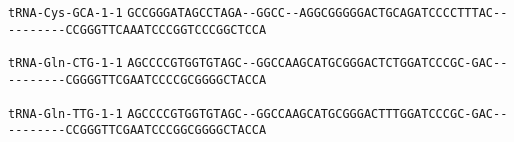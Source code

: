 \documentclass{article}
\newcommand{\rnabox}[1]{\colorbox{#1}{\texttt{#1}}}
\begin{document}
\vspace{-0.5mm}

\texttt{tRNA-Cys-GCA-1-1}
\rnabox{G}\rnabox{C}\rnabox{C}\rnabox{G}\rnabox{G}\rnabox{G}\rnabox{A}\rnabox{T}\rnabox{A}\rnabox{G}\rnabox{C}\rnabox{C}\rnabox{T}\rnabox{A}\rnabox{G}\rnabox{A}\rnabox{-}\rnabox{-}\rnabox{G}\rnabox{G}\rnabox{C}\rnabox{C}\rnabox{-}\rnabox{-}\rnabox{A}\rnabox{G}\rnabox{G}\rnabox{C}\rnabox{G}\rnabox{G}\rnabox{G}\rnabox{G}\rnabox{G}\rnabox{A}\rnabox{C}\rnabox{T}\rnabox{G}\rnabox{C}\rnabox{A}\rnabox{G}\rnabox{A}\rnabox{T}\rnabox{C}\rnabox{C}\rnabox{C}\rnabox{C}\rnabox{T}\rnabox{T}\rnabox{T}\rnabox{A}\rnabox{C}\rnabox{-}\rnabox{-}\rnabox{-}\rnabox{-}\rnabox{-}\rnabox{-}\rnabox{-}\rnabox{-}\rnabox{-}\rnabox{-}\rnabox{C}\rnabox{C}\rnabox{G}\rnabox{G}\rnabox{G}\rnabox{T}\rnabox{T}\rnabox{C}\rnabox{A}\rnabox{A}\rnabox{A}\rnabox{T}\rnabox{C}\rnabox{C}\rnabox{C}\rnabox{G}\rnabox{G}\rnabox{T}\rnabox{C}\rnabox{C}\rnabox{C}\rnabox{G}\rnabox{G}\rnabox{C}\rnabox{T}\rnabox{C}\rnabox{C}\rnabox{A}

\vspace{-0.5mm}

\texttt{tRNA-Gln-CTG-1-1}
\rnabox{A}\rnabox{G}\rnabox{C}\rnabox{C}\rnabox{C}\rnabox{C}\rnabox{G}\rnabox{T}\rnabox{G}\rnabox{G}\rnabox{T}\rnabox{G}\rnabox{T}\rnabox{A}\rnabox{G}\rnabox{C}\rnabox{-}\rnabox{-}\rnabox{G}\rnabox{G}\rnabox{C}\rnabox{C}\rnabox{A}\rnabox{A}\rnabox{G}\rnabox{C}\rnabox{A}\rnabox{T}\rnabox{G}\rnabox{C}\rnabox{G}\rnabox{G}\rnabox{G}\rnabox{A}\rnabox{C}\rnabox{T}\rnabox{C}\rnabox{T}\rnabox{G}\rnabox{G}\rnabox{A}\rnabox{T}\rnabox{C}\rnabox{C}\rnabox{C}\rnabox{G}\rnabox{C}\rnabox{-}\rnabox{G}\rnabox{A}\rnabox{C}\rnabox{-}\rnabox{-}\rnabox{-}\rnabox{-}\rnabox{-}\rnabox{-}\rnabox{-}\rnabox{-}\rnabox{-}\rnabox{-}\rnabox{C}\rnabox{G}\rnabox{G}\rnabox{G}\rnabox{G}\rnabox{T}\rnabox{T}\rnabox{C}\rnabox{G}\rnabox{A}\rnabox{A}\rnabox{T}\rnabox{C}\rnabox{C}\rnabox{C}\rnabox{C}\rnabox{G}\rnabox{C}\rnabox{G}\rnabox{G}\rnabox{G}\rnabox{G}\rnabox{C}\rnabox{T}\rnabox{A}\rnabox{C}\rnabox{C}\rnabox{A}

\vspace{-0.5mm}

\texttt{tRNA-Gln-TTG-1-1}
\rnabox{A}\rnabox{G}\rnabox{C}\rnabox{C}\rnabox{C}\rnabox{C}\rnabox{G}\rnabox{T}\rnabox{G}\rnabox{G}\rnabox{T}\rnabox{G}\rnabox{T}\rnabox{A}\rnabox{G}\rnabox{C}\rnabox{-}\rnabox{-}\rnabox{G}\rnabox{G}\rnabox{C}\rnabox{C}\rnabox{A}\rnabox{A}\rnabox{G}\rnabox{C}\rnabox{A}\rnabox{T}\rnabox{G}\rnabox{C}\rnabox{G}\rnabox{G}\rnabox{G}\rnabox{A}\rnabox{C}\rnabox{T}\rnabox{T}\rnabox{T}\rnabox{G}\rnabox{G}\rnabox{A}\rnabox{T}\rnabox{C}\rnabox{C}\rnabox{C}\rnabox{G}\rnabox{C}\rnabox{-}\rnabox{G}\rnabox{A}\rnabox{C}\rnabox{-}\rnabox{-}\rnabox{-}\rnabox{-}\rnabox{-}\rnabox{-}\rnabox{-}\rnabox{-}\rnabox{-}\rnabox{-}\rnabox{C}\rnabox{C}\rnabox{G}\rnabox{G}\rnabox{G}\rnabox{T}\rnabox{T}\rnabox{C}\rnabox{G}\rnabox{A}\rnabox{A}\rnabox{T}\rnabox{C}\rnabox{C}\rnabox{C}\rnabox{G}\rnabox{G}\rnabox{C}\rnabox{G}\rnabox{G}\rnabox{G}\rnabox{G}\rnabox{C}\rnabox{T}\rnabox{A}\rnabox{C}\rnabox{C}\rnabox{A}
\end{document}
